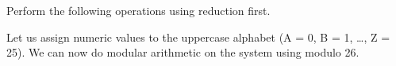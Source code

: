 \documentclass[a4paper]{exam}
\begin{document}
\begin{questions}
\begin{solution}
        \end{solution}

        \pagebreak

        \question[5]
        Perform the following operations using reduction first. 

        \begin{solution}
        \end{solution}

        \question[5]
        Let us assign numeric values to the uppercase alphabet (A = 0, B = 1, \ldots, Z = 25). We can now do modular arithmetic on the system using modulo 26.
        \begin{parts}

\end{parts}
\end{questions}
\end{document}
